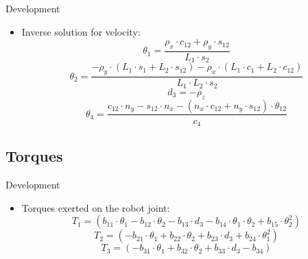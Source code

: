  \begin{frame}{Development}
    \begin{itemize}
      \item Inverse solution for velocity:    
      $$\theta_{1}= \frac{\rho_{x}\cdot c_{12} + \rho_{y}\cdot s_{12}}{L_{1}\cdot s_{2}}$$
      $$ $$
      $$\theta_{2}= \frac{-\rho_{y}\cdot (L_{1}\cdot s_{1} + L_{2}\cdot s_{12}) - \rho_{x}\cdot (L_{1}\cdot c_{1} + L_{2}\cdot c_{12})}
      {L_{1}\cdot L_{2}\cdot s_{2}}$$
      $$ $$
      $$d_{3}= -\rho_{z}$$
      $$ $$
      $$\theta_{4}= \frac{c_{12}\cdot n_{y} - s_{12}\cdot n_{x} - (n_{x}\cdot c_{12} + n_{y}\cdot s_{12})\cdot \theta_{12}}
      {c_{4}}$$
    \end{itemize}
  \end{frame}

\subsection{Torques}
  \begin{frame}{Development}
    \begin{itemize}
      \item Torques exerted on the robot joint:
      $$T_{1}= (b_{11}\cdot \theta_{1} - b_{12}\cdot \theta_{2} - b_{13}\cdot d_{3} - b_{14}\cdot \theta_{1}\cdot \theta_{2} + b_{15}\cdot \theta^{2}_{2})$$
      $$T_{2}= (- b_{21}\cdot \theta_{1} + b_{22}\cdot \theta_{2} + b_{23}\cdot d_{3} + b_{24}\cdot \theta^{2}_{1})$$
      $$T_{3}= (- b_{31}\cdot \theta_{1} + b_{32}\cdot \theta_{2} + b_{33}\cdot d_{3} - b_{34})$$
    \end{itemize}
  \end{frame}

